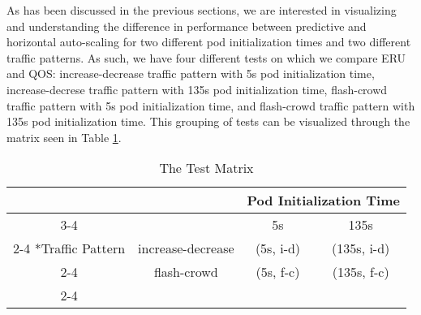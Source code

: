 As has been discussed in the previous sections, we are interested in visualizing
and understanding the difference in performance between predictive and
horizontal auto-scaling for two different pod initialization times and two
different traffic patterns. As such, we have four different tests on which we
compare ERU and QOS: increase-decrease traffic pattern with 5s pod
initialization time, increase-decrese traffic pattern with 135s pod
initialization time, flash-crowd traffic pattern with 5s pod initialization
time, and flash-crowd traffic pattern with 135s pod initialization time. This
grouping of tests can be visualized through the matrix seen in Table
\ref{tab:testmatrix}.

\begin{table}
  \setlength{\extrarowheight}{2pt}
  \begin{tabular}{*{4}{c|}}
    \multicolumn{2}{c}{} & \multicolumn{2}{c}{Pod Initialization Time}\\\cline{3-4}
    \multicolumn{1}{c}{} &  & 5s  & 135s \\\cline{2-4}
    \multirow{2}*{Traffic Pattern}  & increase-decrease & (5s, i-d) & (135s, i-d) \\\cline{2-4}
    & flash-crowd & (5s, f-c) & (135s, f-c) \\\cline{2-4}
  \end{tabular}
  \caption{The Test Matrix}
  \label{tab:testmatrix}
\end{table}


